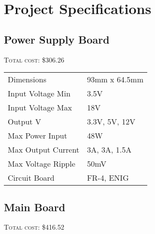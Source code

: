 \chapter{Project Specifications}





\section{Power Supply Board}
\textsc{Total cost: \$306.26} \\

\begin{tabular}{p{} p{}}
\hline
Dimensions                & 93mm x 64.5mm \\
Input Voltage Min      & 3.5V \\
Input Voltage Max     & 18V \\
Output V                   & 3.3V, 5V, 12V \\
Max Power Input      & 48W \\
Max Output Current & 3A, 3A, 1.5A \\
Max Voltage Ripple   & 50mV \\
Circuit Board                          & FR-4, ENIG \\
\hline
\end{tabular}

\section{Main Board}
\textsc{Total cost: \$416.52} \\

